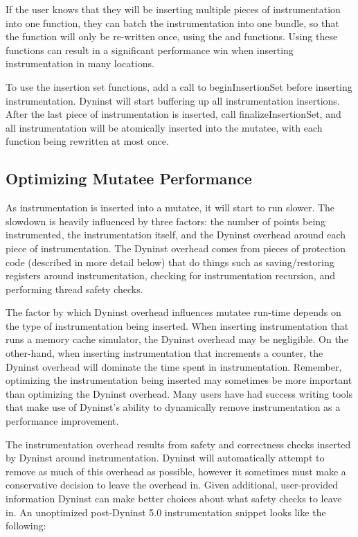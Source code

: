 If the user knows that they will be inserting multiple pieces of
instrumentation into one function, they can batch the
instrumentation into one bundle, so that the function will only be
re-written once, using the  and
 functions. Using these functions
can result in a significant performance win when inserting
instrumentation in many locations.

To use the insertion set functions, add a call to beginInsertionSet
before inserting instrumentation. Dyninst will
start buffering up all instrumentation insertions. After the last
piece of instrumentation is inserted, call
finalizeInsertionSet, and all instrumentation will be atomically
inserted into the mutatee, with each function being
rewritten at most once.

\subsection{Optimizing Mutatee Performance}

As instrumentation is inserted into a mutatee, it will start to run
slower. The slowdown is heavily influenced by
three factors: the number of points being instrumented, the
instrumentation itself, and the Dyninst overhead around
each piece of instrumentation. The Dyninst overhead comes from pieces
of protection code (described in more detail
below) that do things such as saving/restoring registers around
instrumentation, checking for instrumentation
recursion, and performing thread safety checks.

The factor by which Dyninst overhead influences mutatee run-time
depends on the type of instrumentation being inserted.
When inserting instrumentation that runs a memory cache simulator,
the Dyninst overhead may be negligible. On the
other-hand, when inserting instrumentation that increments a counter,
the Dyninst overhead will dominate the time spent
in instrumentation. Remember, optimizing the instrumentation being
inserted may sometimes be more important than
optimizing the Dyninst overhead. Many users have had success writing
tools that make use of
Dyninst's ability to dynamically remove instrumentation as a
performance improvement.

The instrumentation overhead results from safety and correctness
checks inserted by Dyninst around instrumentation.
Dyninst will automatically attempt to remove as much of this overhead
as possible, however it sometimes must make a
conservative decision to leave the overhead in. Given additional,
user-provided information Dyninst can make better
choices about what safety checks to leave in. An unoptimized
post-Dyninst 5.0 instrumentation snippet looks like the
following:

